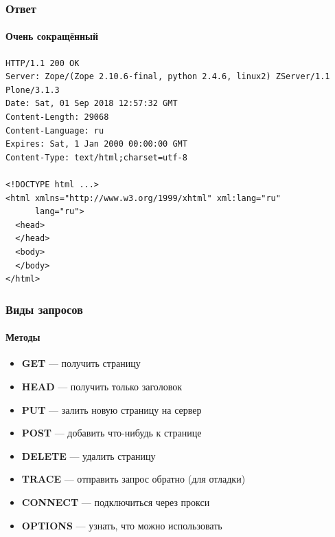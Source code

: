 \documentclass{../../slides-style}
\begin{document}
    \begin{frame}[fragile]
        \frametitle{Ответ}
        \framesubtitle{Очень сокращённый}
        \begin{small}
            \begin{verbatim}
HTTP/1.1 200 OK
Server: Zope/(Zope 2.10.6-final, python 2.4.6, linux2) ZServer/1.1 Plone/3.1.3
Date: Sat, 01 Sep 2018 12:57:32 GMT
Content-Length: 29068
Content-Language: ru
Expires: Sat, 1 Jan 2000 00:00:00 GMT
Content-Type: text/html;charset=utf-8

<!DOCTYPE html ...>
<html xmlns="http://www.w3.org/1999/xhtml" xml:lang="ru"
      lang="ru">
  <head>
  </head>
  <body>
  </body>
</html>
            \end{verbatim}
        \end{small}
    \end{frame}

    \begin{frame}
        \frametitle{Виды запросов}
        \framesubtitle{Методы}
        \begin{itemize}
            \item \textbf{GET} --- получить страницу
            \item \textbf{HEAD} --- получить только заголовок
            \item \textbf{PUT} --- залить новую страницу на сервер
            \item \textbf{POST} --- добавить что-нибудь к странице
            \item \textbf{DELETE} --- удалить страницу
            \item \textbf{TRACE} --- отправить запрос обратно (для отладки)
            \item \textbf{CONNECT} --- подключиться через прокси
            \item \textbf{OPTIONS} --- узнать, что можно использовать
        \end{itemize}
    \end{frame}
\end{document}
